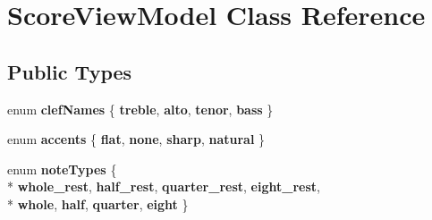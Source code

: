 \hypertarget{class_score_view_model}{}\section{Score\+View\+Model Class Reference}
\label{class_score_view_model}
\subsection*{Public Types}
\begin{DoxyCompactItemize}
\item 
\hypertarget{class_score_view_model_a2e603d26e71fb126b64895ae0b1636d2}{}enum {\bfseries clef\+Names} \{ {\bfseries treble}, 
{\bfseries alto}, 
{\bfseries tenor}, 
{\bfseries bass}
 \}\label{class_score_view_model_a2e603d26e71fb126b64895ae0b1636d2}

\item 
\hypertarget{class_score_view_model_a8b24e5bf70ec80a749d798cb7e907964}{}enum {\bfseries accents} \{ {\bfseries flat}, 
{\bfseries none}, 
{\bfseries sharp}, 
{\bfseries natural}
 \}\label{class_score_view_model_a8b24e5bf70ec80a749d798cb7e907964}

\item 
\hypertarget{class_score_view_model_a8e5435988383d8b15ff30eb41f1c0a5d}{}enum {\bfseries note\+Types} \{ \\*
{\bfseries whole\+\_\+rest}, 
{\bfseries half\+\_\+rest}, 
{\bfseries quarter\+\_\+rest}, 
{\bfseries eight\+\_\+rest}, 
\\*
{\bfseries whole}, 
{\bfseries half}, 
{\bfseries quarter}, 
{\bfseries eight}
 \}\label{class_score_view_model_a8e5435988383d8b15ff30eb41f1c0a5d}

\end{DoxyCompactItemize}

